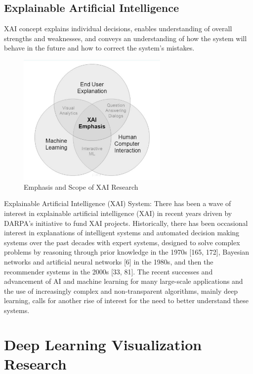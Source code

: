 \subsection{Explainable Artificial Intelligence}
XAI concept explains individual decisions, enables understanding of overall strengths and weaknesses, and conveys an understanding of how the system will behave in the future and how to correct the system’s mistakes.

\begin{figure}[htbp]
\centering
\includegraphics[width=0.65\textwidth]{images/XAI Research-1-crop.png}
\caption{Emphasis and Scope of XAI Research}
\label{fig:xai-1}
\end{figure}

Explainable Artificial Intelligence (XAI) System:  There has been a wave of interest in explainable artificial intelligence (XAI) in recent years driven by DARPA’s initiative to fund XAI projects. Historically, there has been occasional interest in explanations of intelligent systems and automated decision making systems over the past decades with expert systems, designed to solve complex problems by reasoning through prior knowledge in the 1970s [165, 172], Bayesian networks and artificial neural networks [6] in the 1980s, and then the recommender systems in the 2000s [33, 81]. The recent successes and advancement of AI and machine learning for many large-scale applications and the use of increasingly complex and non-transparent algorithms, mainly deep learning, calls for another rise of interest for the need to better understand these systems.

\section{Deep Learning Visualization Research}

